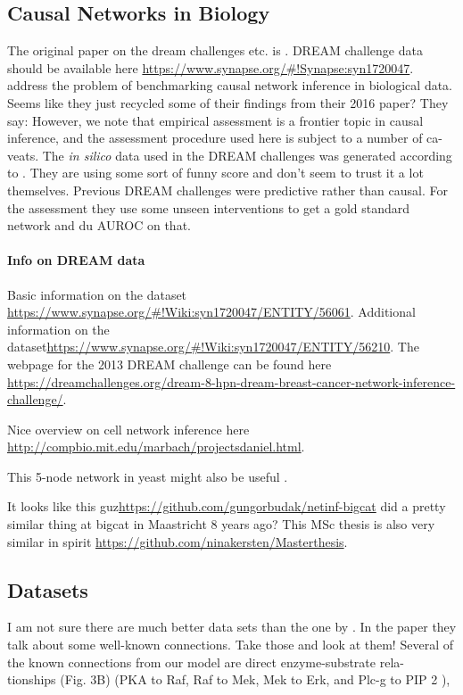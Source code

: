 \documentclass{article}
\begin{document}
\subsection{Causal Networks in Biology}
The original paper on the dream challenges etc. is \cite{hill2016inferring}.
DREAM challenge data should be available here \url{https://www.synapse.org/#!Synapse:syn1720047}.
\cite{hill2017context} address the problem of benchmarking causal network inference in biological data. Seems like they just recycled some of their findings from their 2016 paper? They say: However, we note that empirical
assessment is a frontier topic in causal inference, and the
assessment procedure used here is subject to a number of ca-
veats.
The \emph{in silico} data used in the DREAM challenges was generated according to \cite{chen2009input}.
They are using some sort of funny score and don't seem to trust it a lot themselves. Previous DREAM challenges were predictive rather than causal.
For the assessment they use some unseen interventions to get a gold standard network and du AUROC on that.

\paragraph{Info on DREAM data}
Basic information on the dataset \url{https://www.synapse.org/#!Wiki:syn1720047/ENTITY/56061}. Additional information on the dataset\url{https://www.synapse.org/#!Wiki:syn1720047/ENTITY/56210}. The webpage for the 2013 DREAM challenge can be found here \url{https://dreamchallenges.org/dream-8-hpn-dream-breast-cancer-network-inference-challenge/}.

Nice overview on cell network inference here \url{http://compbio.mit.edu/marbach/projectsdaniel.html}.

This 5-node network in yeast might also be useful \cite{cantone2009yeast}.

\vspace{.5em}

It looks like this guz\url{https://github.com/gungorbudak/netinf-bigcat} did a pretty similar thing at bigcat in Maastricht 8 years ago?
This MSc thesis is also very similar in spirit \url{https://github.com/ninakersten/Masterthesis}.

\subsection{Datasets}

I am not sure there are much better data sets than the one by \cite{sachs2005causal}.
In the paper they talk about some well-known connections. Take those and look at them!
Several of the known connections from
our model are direct enzyme-substrate rela-
tionships (Fig. 3B) (PKA to Raf, Raf to Mek,
Mek to Erk, and Plc-g to PIP 2 ),
\end{document}
